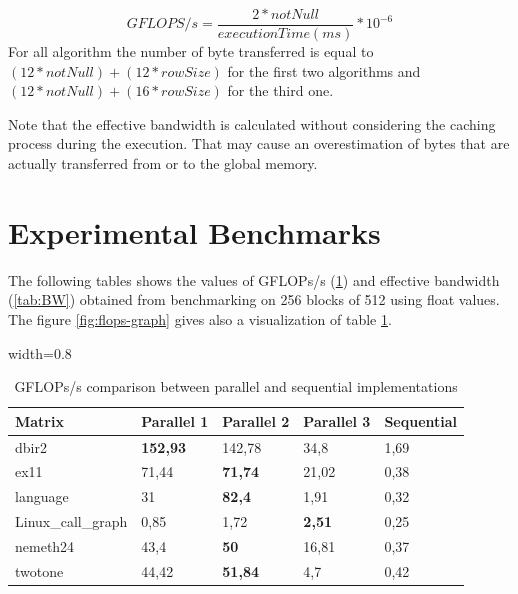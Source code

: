 \documentclass[conference]{IEEEtran}
\begin{document}
\begin{equation}
GFLOPS/s= \frac{2*notNull}{executionTime(ms)}*10^{-6}
\end{equation}
For all algorithm the number of byte transferred is equal to $(12*notNull)+(12*rowSize)$ for the first two algorithms and 
$(12*notNull)+(16*rowSize)$ for the third one.

Note that the effective bandwidth is calculated without considering the caching process during the execution. That may cause an overestimation of bytes that are actually transferred from or to the global memory. 
\section{Experimental Benchmarks}
The following tables shows the values of GFLOPs/s (\ref{tab:GFLOPS}) and effective bandwidth (\ref{tab:BW}) obtained from benchmarking on 256 blocks of 512 using float values. 
The figure \ref{fig:flops-graph} gives also a visualization of table \ref{tab:GFLOPS}.
\begin{table}[h]
    \centering
    \begin{adjustbox}{width=0.8\columnwidth}
    \begin{tabular}{lllll}
    \toprule
    \textbf{Matrix} & \textbf{Parallel 1} & \textbf{Parallel 2} & \textbf{Parallel 3} & \textbf{Sequential} \\
    \midrule
    dbir2 \cite{dbir2} & \textbf{152,93} & 142,78 & 34,8 & 1,69 \\
    ex11 \cite{ex11} & 71,44 & \textbf{71,74} & 21,02 & 0,38 \\
    language \cite{language} & 31 & \textbf{82,4} & 1,91 & 0,32\\
    Linux\_call\_graph \cite{linuxcallgraph} & 0,85 & 1,72 & \textbf{2,51} & 0,25 \\ 
    nemeth24 \cite{nemeth24} & 43,4 & \textbf{50} & 16,81 & 0,37 \\
    twotone \cite{twotone} & 44,42 & \textbf{51,84} & 4,7 & 0,42 \\
    \bottomrule
    \end{tabular}
    \end{adjustbox}
    \vspace{1em}
    \caption{GFLOPs/s comparison between parallel and sequential implementations}
    \label{tab:GFLOPS}
\end{table}
\end{document}
